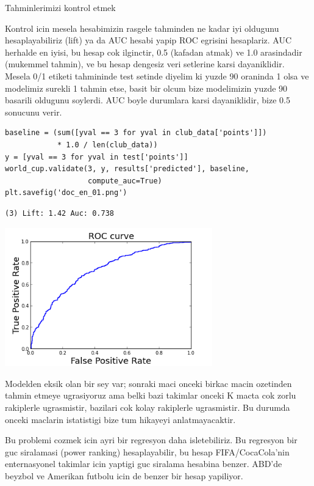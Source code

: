 \documentclass[12pt,fleqn]{article}\usepackage{../common}
\begin{document}
Tahminlerimizi kontrol etmek

Kontrol icin mesela hesabimizin rasgele tahminden ne kadar iyi oldugunu
hesaplayabiliriz (lift) ya da AUC hesabi yapip ROC egrisini hesaplariz. AUC
herhalde en iyisi, bu hesap cok ilginctir, 0.5 (kafadan atmak) ve 1.0
arasindadir (mukemmel tahmin), ve bu hesap dengesiz veri setlerine karsi
dayaniklidir. Mesela 0/1 etiketi tahmininde test setinde diyelim ki yuzde 90
oraninda 1 olsa ve modelimiz surekli 1 tahmin etse, basit bir olcum bize
modelimizin yuzde 90 basarili oldugunu soylerdi. AUC boyle durumlara karsi
dayaniklidir, bize 0.5 sonucunu verir. 

\begin{verbatim}
baseline = (sum([yval == 3 for yval in club_data['points']]) 
            * 1.0 / len(club_data))
y = [yval == 3 for yval in test['points']]
world_cup.validate(3, y, results['predicted'], baseline, 
                   compute_auc=True)
plt.savefig('doc_en_01.png')
\end{verbatim}

\begin{verbatim}
(3) Lift: 1.42 Auc: 0.738
\end{verbatim}

\includegraphics[height=6cm]{doc_en_01.png}

Modelden eksik olan bir sey var; sonraki maci onceki birkac macin ozetinden
tahmin etmeye ugrasiyoruz ama belki bazi takimlar onceki K macta cok zorlu
rakiplerle ugrasmistir, bazilari cok kolay rakiplerle ugrasmistir. Bu
durumda onceki maclarin istatistigi bize tum hikayeyi anlatmayacaktir. 

Bu problemi cozmek icin ayri bir regresyon daha isletebiliriz. Bu regresyon
bir guc siralamasi (power ranking) hesaplayabilir, bu hesap
FIFA/CocaCola'nin enternasyonel takimlar icin yaptigi 
guc siralama hesabina benzer. ABD'de beyzbol ve Amerikan futbolu icin de
benzer bir hesap yapiliyor. 
\end{document}
